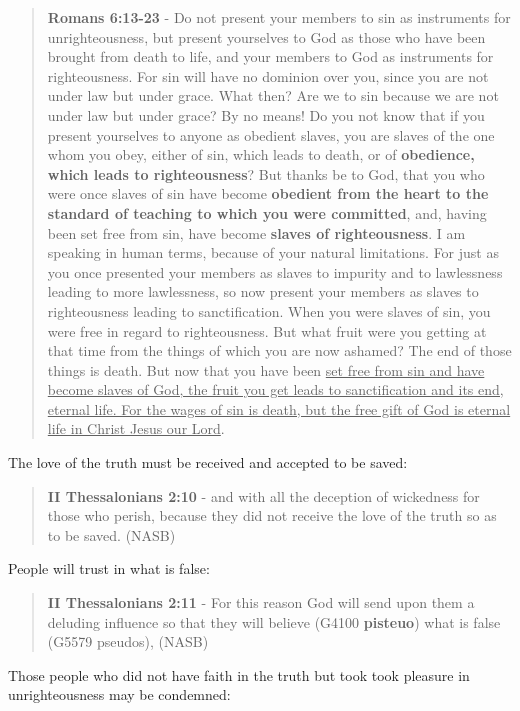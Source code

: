 \documentclass[11pt]{article}
\begin{document}
\begin{quote}
\textbf{Romans 6:13-23} - Do not present your members to sin as instruments for unrighteousness, but present yourselves to God as those who have been brought from death to life, and your members to God as instruments for righteousness.  For sin will have no dominion over you, since you are not under law but under grace.  What then? Are we to sin because we are not under law but under grace? By no means!  Do you not know that if you present yourselves to anyone as obedient slaves, you are slaves of the one whom you obey, either of sin, which leads to death, or of \textbf{obedience, which leads to righteousness}?  But thanks be to God, that you who were once slaves of sin have become \textbf{obedient from the heart to the standard of teaching to which you were committed}, and, having been set free from sin, have become \textbf{slaves of righteousness}.  I am speaking in human terms, because of your natural limitations. For just as you once presented your members as slaves to impurity and to lawlessness leading to more lawlessness, so now present your members as slaves to righteousness leading to sanctification.  When you were slaves of sin, you were free in regard to righteousness.  But what fruit were you getting at that time from the things of which you are now ashamed? The end of those things is death.  But now that you have been \uline{set free from sin and have become slaves of God, the fruit you get leads to sanctification and its end, eternal life.  For the wages of sin is death, but the free gift of God is eternal life in Christ Jesus our Lord}.
\end{quote}

The love of the truth must be received and accepted to be saved:

\begin{quote}
\textbf{II Thessalonians 2:10} - and with all the deception of wickedness for those who perish, because they did not receive the love of the truth so as to be saved. (NASB)
\end{quote}

People will trust in what is false:

\begin{quote}
\textbf{II Thessalonians 2:11} - For this reason God will send upon them a deluding influence so that they will believe (G4100 \textbf{pisteuo}) what is false (G5579 pseudos), (NASB)
\end{quote}

Those people who did not have faith in the truth but took took pleasure in unrighteousness may be condemned:
\end{document}
